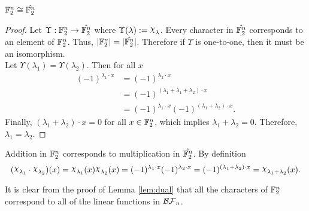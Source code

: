 \begin{lemma}\label{lem:dual}
  $\mathbb{F}_2^n\cong\hat{\mathbb{F}_2^n}$
\end{lemma}

\begin{proof}
  \par Let $\Upsilon:\mathbb{F}_2^n\rightarrow\hat{\mathbb{F}_2^n}$ where
  $\Upsilon(\lambda):=\Chi_\lambda$.
	Every character in $\hat{\mathbb{F}_2^n}$ corresponds to an element of
  $\mathbb{F}_2^n$. Thus, $\lvert\mathbb{F}_2^n\rvert=\lvert\hat{\mathbb{F}_2^n}\rvert$.
  Therefore if $\Upsilon$ is one-to-one, then it must be an isomorphism.\\
	Let $\Upsilon(\lambda_1)=\Upsilon(\lambda_2)$. Then for all $x$
	\begin{align*}
		(-1)^{\lambda_1\cdot x}
      &=(-1)^{\lambda_2\cdot x}\\
		  &=(-1)^{(\lambda_1+\lambda_1+\lambda_2)\cdot x}\\
      &=(-1)^{\lambda_1\cdot x}(-1)^{(\lambda_1+\lambda_2)\cdot x}.
	\end{align*}
	Finally, $(\lambda_1+\lambda_2)\cdot x=0$ for all $x\in\mathbb{F}_2^n$, which
  implies $\lambda_1+\lambda_2=0$. Therefore, $\lambda_1=\lambda_2$.
\end{proof}

\par Addition in $\mathbb{F}_2^n$ corresponds to multiplication in
$\hat{\mathbb{F}_2^n}$. By definition
\[
(\Chi_{\lambda_1}\cdot\Chi_{\lambda_2})(x)
  =\Chi_{\lambda_1}(x)\Chi_{\lambda_2}(x)
  =(-1)^{\lambda_1\cdot x}(-1)^{\lambda_2\cdot x}
  =(-1)^{(\lambda_1+\lambda_2)\cdot x}
  =\Chi_{\lambda_1+\lambda_2}(x).
\]

\par It is clear from the proof of Lemma \ref{lem:dual} that all the characters
of $\mathbb{F}_2^n$ correspond to all of the linear functions in $\mathcal{BF}_n$.


